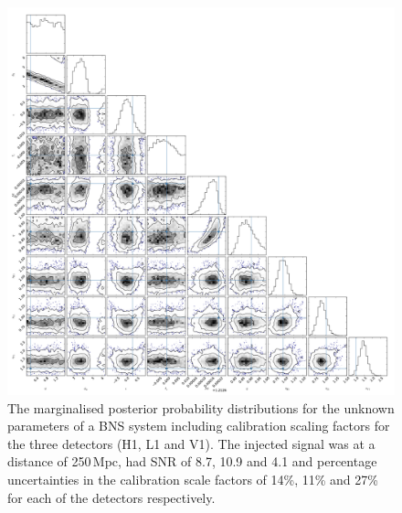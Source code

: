 \documentclass[10pt]{iopart}
\begin{document}
\begin{figure}
 \begin{center}
  \includegraphics[width=1.0\textwidth]{bns_post_fig.pdf}
 \end{center}
 \caption{\label{fig:bnspost} The marginalised posterior probability distributions for the unknown
 parameters of a \ac{BNS} system including calibration scaling factors for the three detectors (H1, 
L1 and V1). The injected signal was at a distance of 250\,Mpc, had \ac{SNR} of 8.7, 10.9 and 4.1 
and percentage uncertainties in the calibration scale factors of 14\%, 11\% and 27\% for each of 
the detectors respectively.}
\end{figure}
\end{document}
